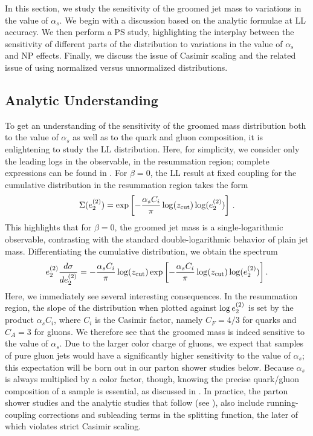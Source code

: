
In this section, we study the sensitivity of the groomed jet mass to variations in the value of $\alpha_s$.
%
We begin with a discussion based on the analytic formulae at LL accuracy.
%
We then perform a PS study, highlighting the interplay between the sensitivity of different parts of the distribution to variations in the value of $\alpha_s$ and NP effects.
%
Finally, we discuss the issue of Casimir scaling and the related issue of using normalized versus unnormalized distributions.


\subsection{Analytic Understanding}
\label{sec:analytic}

To get an understanding of the sensitivity of the groomed mass distribution both to the value of $\alpha_s$ as well as to the quark and gluon composition, it is enlightening to study the LL distribution.
%
Here, for simplicity, we consider only the leading logs in the observable, in the resummation region; complete expressions can be found in .
%
For $\beta=0$, the LL result at fixed coupling for the cumulative distribution in the resummation region takes the form
%
\begin{align}
\Sigma(e_{2}^{(2)})=\exp\left[ - \frac{\alpha_s C_i}{\pi} \log(z_{\rm cut}) \log (e_{2}^{(2)}) \right]\,.
\end{align}
%
This highlights that for $\beta=0$, the groomed jet mass is a single-logarithmic observable, contrasting with the standard double-logarithmic behavior of plain jet mass.
%
Differentiating the cumulative distribution, we obtain the spectrum
%
\begin{align}
\label{eq:ecf_ll_dsitribution}
e_{2}^{(2)}  \frac{d\sigma}{d e_{2}^{(2)}}=   - \frac{\alpha_s C_i}{\pi} \log(z_{\rm cut})   \exp\left[ - \frac{\alpha_s C_i}{\pi}  \log(z_{\rm cut}) \log (e_{2}^{(2)}) \right].
\end{align}
%
Here, we immediately see several interesting consequences.
%
In the resummation region, the slope of the distribution when plotted against $\log e_{2}^{(2)}$ is set by the product $\alpha_s C_i$, where $C_i$ is the Casimir factor, namely $C_F = 4/3$ for quarks and $C_A = 3$ for gluons.
%
We therefore see that the groomed mass is indeed sensitive to the value of $\alpha_s$.
%
Due to the larger color charge of gluons, we expect that samples of pure gluon jets would have a significantly higher sensitivity to the value of $\alpha_s$; this expectation will be born out in our parton shower studies below.
%
Because $\alpha_s$ is always multiplied by a color factor, though, knowing the precise quark/gluon composition of a sample is essential, as discussed in .
%
In practice, the parton shower studies and the analytic studies that follow (see ), also include running-coupling corrections  and subleading terms in the splitting function, the later of which violates strict Casimir scaling.


